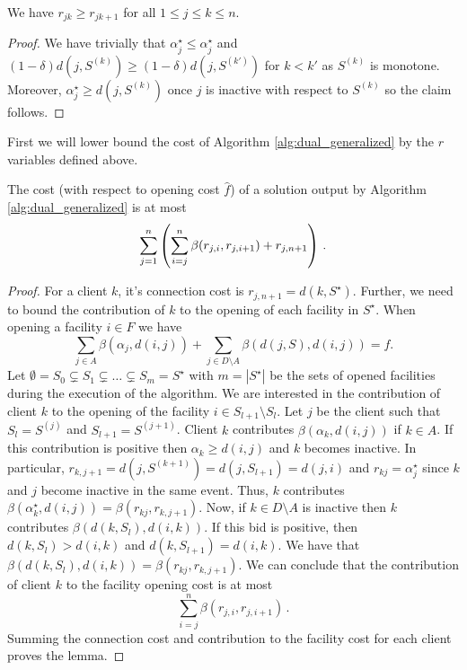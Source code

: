\begin{observation}
\label{obs:r-mono}
We have $r_{jk} \geq r_{jk+1}$ for all $1 \leq j \leq k \leq n$.
\end{observation}
\begin{proof}
    We have trivially that $\alpha_j^\star \leq \alpha_j^\star$ and $(1-\delta) d(j, S^{(k)}) \geq (1-\delta) d(j, S^{(k')})$ for $k < k'$ as $S^{(k)}$ is monotone.
    Moreover, $\alpha_j^\star \geq d(j, S^{(k)})$ once $j$ is inactive with respect to $S^{(k)}$ so the claim follows.
\end{proof}
First we will lower bound the cost of Algorithm \ref{alg:dual_generalized} by the $r$ variables defined above. 
\begin{lemma}
\label{lemma:alg-cost-ufl}
    The cost (with respect to opening cost $\hat{f}$) of a solution output by Algorithm \ref{alg:dual_generalized} is at most
    \[\sum_{j=1}^n \left(\sum_{i=j}^{n} \beta(r_{j,i}, r_{j,i+1}) + r_{j,n+1}\right)\,.\]
\end{lemma}
\begin{proof}    
For a client $k$, it's connection cost is $r_{j,n+1} = d(k,S^\star)$. Further, we need to bound the contribution of $k$ to the opening of each facility in $S^\star$. When opening a facility $i \in F$ we have 
\[
    \sum_{j \in A} \beta(\alpha_j, d(i,j)) + \sum_{j \in D \setminus A} \beta(d(j,S),d(i,j)) = f.
\]
Let $\emptyset = S_0 \subsetneq S_1 \subsetneq \ldots \subsetneq S_m = S^\star$ with $m = |S^\star|$ be the sets of opened facilities during the execution of the algorithm. 
We are interested in the contribution of client $k$ to the opening of the facility $i \in S_{l+1} \setminus S_l$. 
Let $j$ be the client such that $S_l = S^{(j)}$ and $S_{l+1} = S^{(j+1)}$.
Client $k$ contributes $\beta(\alpha_k, d(i,j))$ if $k \in A$. If this contribution is positive then $\alpha_k \ge d(i,j)$ and $k$ becomes inactive. In particular, $r_{k,j+1} = d(j,S^{(k+1)}) = d(j,S_{l+1}) = d(j,i)$ and $r_{kj} = \alpha^\star_j$ since $k$ and $j$ become inactive in the same event. Thus, $k$ contributes $\beta(\alpha^\star_k, d(i,j)) = \beta(r_{kj}, r_{k,j+1})$. 
\newline Now, if $k \in D \setminus A$ is inactive then $k$ contributes $\beta(d(k,S_l),d(i,k))$. If this bid is positive, then $d(k,S_l) > d(i,k)$ and $d(k,S_{l+1}) = d(i,k)$. We have that $\beta(d(k,S_l),d(i,k)) = \beta(r_{kj},r_{k,j+1})$. We can conclude that the contribution of client $k$ to the facility opening cost is at most
\[
    \sum_{i=j}^{n} \beta(r_{j,i}, r_{j,i+1})\,.
\]
Summing the connection cost and contribution to the facility cost for each client proves the lemma.
\end{proof}

